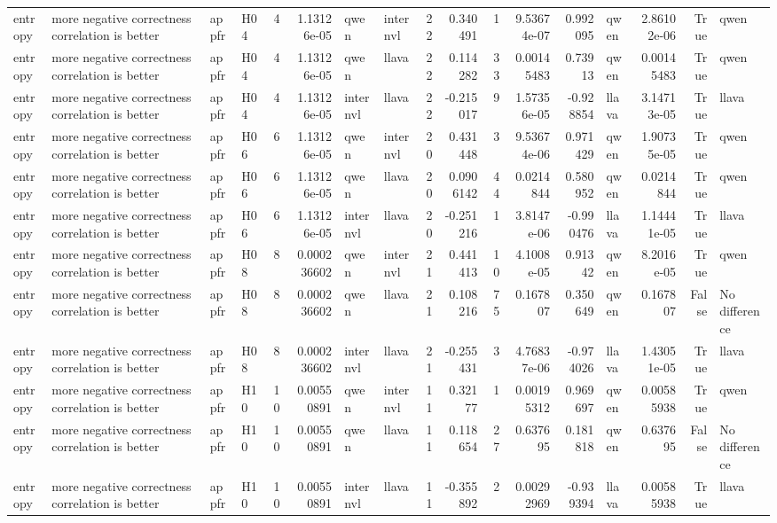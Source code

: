 \begin{longtable}{llllrrllrrrrrlrrl}
entropy & more negative correctness correlation is better & appfr & H04 & 4 & 1.13126e-05 & qwen & internvl & 22 & 0.340491 & 1 & 9.53674e-07 & 0.992095 & qwen & 2.86102e-06 & True & qwen \\
entropy & more negative correctness correlation is better & appfr & H04 & 4 & 1.13126e-05 & qwen & llava & 22 & 0.114282 & 33 & 0.00145483 & 0.73913 & qwen & 0.00145483 & True & qwen \\
entropy & more negative correctness correlation is better & appfr & H04 & 4 & 1.13126e-05 & internvl & llava & 22 & -0.215017 & 9 & 1.57356e-05 & -0.928854 & llava & 3.14713e-05 & True & llava \\
entropy & more negative correctness correlation is better & appfr & H06 & 6 & 1.13126e-05 & qwen & internvl & 20 & 0.431448 & 3 & 9.53674e-06 & 0.971429 & qwen & 1.90735e-05 & True & qwen \\
entropy & more negative correctness correlation is better & appfr & H06 & 6 & 1.13126e-05 & qwen & llava & 20 & 0.0906142 & 44 & 0.0214844 & 0.580952 & qwen & 0.0214844 & True & qwen \\
entropy & more negative correctness correlation is better & appfr & H06 & 6 & 1.13126e-05 & internvl & llava & 20 & -0.251216 & 1 & 3.8147e-06 & -0.990476 & llava & 1.14441e-05 & True & llava \\
entropy & more negative correctness correlation is better & appfr & H08 & 8 & 0.000236602 & qwen & internvl & 21 & 0.441413 & 10 & 4.1008e-05 & 0.91342 & qwen & 8.2016e-05 & True & qwen \\
entropy & more negative correctness correlation is better & appfr & H08 & 8 & 0.000236602 & qwen & llava & 21 & 0.108216 & 75 & 0.167807 & 0.350649 & qwen & 0.167807 & False & No difference \\
entropy & more negative correctness correlation is better & appfr & H08 & 8 & 0.000236602 & internvl & llava & 21 & -0.255431 & 3 & 4.76837e-06 & -0.974026 & llava & 1.43051e-05 & True & llava \\
entropy & more negative correctness correlation is better & appfr & H10 & 10 & 0.00550891 & qwen & internvl & 11 & 0.32177 & 1 & 0.00195312 & 0.969697 & qwen & 0.00585938 & True & qwen \\
entropy & more negative correctness correlation is better & appfr & H10 & 10 & 0.00550891 & qwen & llava & 11 & 0.118654 & 27 & 0.637695 & 0.181818 & qwen & 0.637695 & False & No difference \\
entropy & more negative correctness correlation is better & appfr & H10 & 10 & 0.00550891 & internvl & llava & 11 & -0.355892 & 2 & 0.00292969 & -0.939394 & llava & 0.00585938 & True & llava \\

\end{longtable}
